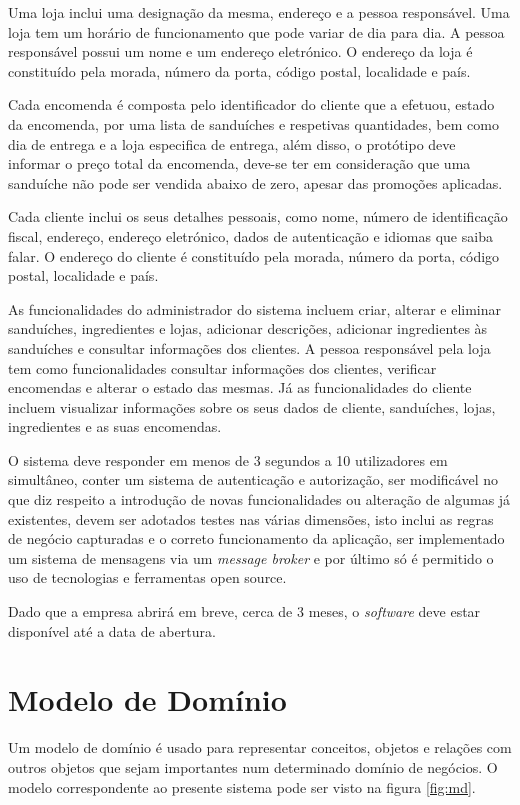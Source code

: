 Uma loja inclui uma designação da mesma, endereço e a pessoa responsável. Uma loja tem um horário de funcionamento que pode variar de dia para dia. A pessoa responsável possui um nome e um endereço eletrónico. O endereço da loja é constituído pela morada, número da porta, código postal, localidade e país.

Cada encomenda é composta pelo identificador do cliente que a efetuou, estado da encomenda, por uma lista de sanduíches e respetivas quantidades, bem como dia de entrega e a loja especifica de entrega, além disso, o protótipo deve informar o preço total da encomenda, deve-se ter em consideração que uma sanduíche não pode ser vendida abaixo de zero, apesar das promoções aplicadas.

Cada cliente inclui os seus detalhes pessoais, como nome, número de identificação fiscal, endereço, endereço eletrónico, dados de autenticação e idiomas que saiba falar. O endereço do cliente é constituído pela morada, número da porta, código postal, localidade e país.

As funcionalidades do administrador do sistema incluem criar, alterar e eliminar sanduíches, ingredientes e lojas, adicionar descrições, adicionar ingredientes às sanduíches e consultar informações dos clientes. A pessoa responsável pela loja tem como funcionalidades consultar informações dos clientes, verificar encomendas e alterar o estado das mesmas. Já as funcionalidades do cliente incluem visualizar informações sobre os seus dados de cliente, sanduíches, lojas, ingredientes e as suas encomendas.

O sistema deve responder em menos de 3 segundos a 10 utilizadores em simultâneo, conter um sistema de autenticação e autorização, ser modificável no que diz respeito a introdução de novas funcionalidades ou alteração de algumas já existentes, devem ser adotados testes nas várias dimensões, isto inclui as regras de negócio capturadas e o correto funcionamento da aplicação, ser implementado um sistema de mensagens via um \textit{message broker} e por último só é permitido o uso de tecnologias e ferramentas open source.

Dado que a empresa abrirá em breve, cerca de 3 meses, o \textit{software} deve estar disponível até a data de abertura.

\section{Modelo de Domínio}

Um modelo de domínio é usado para representar conceitos, objetos e relações com outros objetos que sejam importantes num determinado domínio de negócios. O modelo correspondente ao presente sistema pode ser visto na figura \ref{fig:md}.

